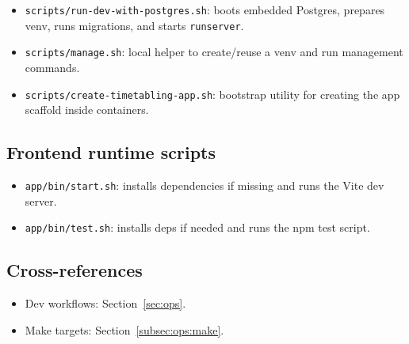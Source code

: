 \begin{itemize}
  \item \texttt{scripts/run-dev-with-postgres.sh}: boots embedded Postgres, prepares venv, runs migrations, and starts \texttt{runserver}.
  \item \texttt{scripts/manage.sh}: local helper to create/reuse a venv and run management commands.
  \item \texttt{scripts/create-timetabling-app.sh}: bootstrap utility for creating the app scaffold inside containers.
\end{itemize}

\subsection{Frontend runtime scripts}
\label{subsec:ops:scripts:frontend}

\begin{itemize}
  \item \texttt{app/bin/start.sh}: installs dependencies if missing and runs the Vite dev server.
  \item \texttt{app/bin/test.sh}: installs deps if needed and runs the npm test script.
\end{itemize}

\subsection{Cross-references}
\label{subsec:ops:scripts:links}

\begin{itemize}
  \item Dev workflows: Section~\ref{sec:ops}.
  \item Make targets: Section~\ref{subsec:ops:make}.
\end{itemize}
